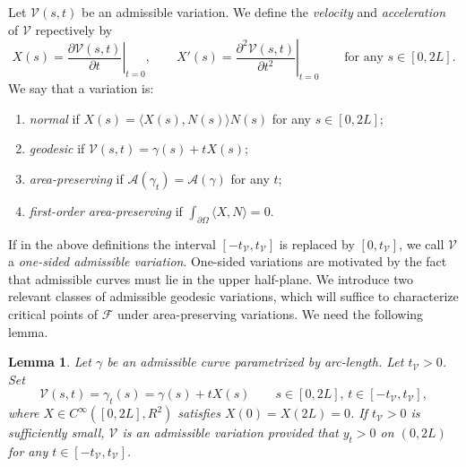 \documentclass[11pt]{amsart}
\newcommand{\A}{\mathcal A}
\newcommand{\F}{\mathcal F}
\newcommand{\Om}{\Omega}
\newtheorem{lemma}[theorem]{Lemma}
\theoremstyle{definition}
\theoremstyle{remark}
\numberwithin{equation}{section}
\begin{document}
	Let $\mathcal V(s,t)$ be an admissible variation.  We define the \emph{velocity} and \emph{acceleration} of $\mathcal V$ repectively by
	\begin{equation*}
		X(s)=\left.\frac{\partial \mathcal V(s,t)}{\partial t}\right|_{t=0},\qquad X'(s)=\left.\frac{\partial^2 \mathcal V(s,t)}{\partial t^2}\right|_{t=0} \qquad\text{for any $s\in[0,2L]$.}
	\end{equation*}
	We say that a variation is:
	\medskip
	\begin{enumerate}
		\item [(i)] \emph{normal} if $X(s)=\langle X(s),N(s)\rangle N(s)$ for any $s\in[0,2L]$;
		\medskip
		\item [(ii)]  \emph{geodesic} if $\mathcal V(s,t)=\gamma(s)+t X(s)$;
		\medskip
		\item [(iii)] \emph{area-preserving} if $\A(\gamma_t)=\A(\gamma)$ for any $t$;
		\medskip
		\item [(iv)] \emph{first-order area-preserving} if $\int_{\partial\Om}\langle X,N\rangle=0.$
		\medskip
	\end{enumerate}
	If in the above definitions the interval $[-t_{\mathcal V},t_{\mathcal V}]$ is replaced by $[0,t_{\mathcal V}]$, we call $\mathcal V$ a \emph{one-sided admissible variation}. One-sided variations are motivated by the fact that admissible curves must lie in the upper half-plane. 
	We introduce two relevant classes of admissible geodesic variations, which will suffice to characterize critical points of $\F$  under area-preserving variations. We need the following lemma.
	\begin{lemma}\label{lem}
		Let $\gamma$ be an admissible curve parametrized by arc-length. Let $t_{\mathcal V}>0$. Set
		\begin{equation}\label{variation}
			\mathcal V(s,t)=\gamma_t(s)=\gamma(s)+tX(s)\qquad\text{$s\in[0,2L]$, $t\in[-t_{\mathcal V},t_{\mathcal V}]$},
		\end{equation}
		where $X\in C^\infty([0,2L],R^2)$ satisfies $X(0)=X(2L)=0$. If $t_{\mathcal V}>0$ is sufficiently small, $\mathcal V$ is an admissible variation provided that $y_t>0$ on $(0,2L)$ for any $t\in [-t_{\mathcal V},t_{\mathcal V}]$.
	\end{lemma}
\end{document}
